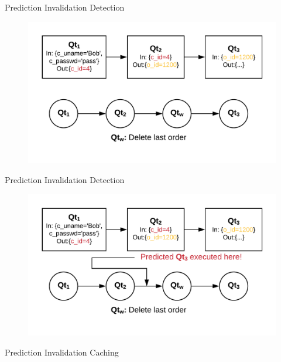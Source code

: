 \documentclass[10pt]{beamer}
\begin{document}
\begin{frame}[fragile]{Prediction Invalidation Detection}
    \begin{figure}
        \center
        \includegraphics[scale=0.22]{apollo_write_boundary}
    \end{figure}
\end{frame}

\begin{frame}[fragile]{Prediction Invalidation Detection}
    \begin{figure}
        \center
        \includegraphics[scale=0.22]{apollo_write_boundary_2}
    \end{figure}
\end{frame}

\begin{frame}[fragile]{Prediction Invalidation Caching}
    \begin{itemize}
    \end{itemize}
\end{frame}
\end{document}
